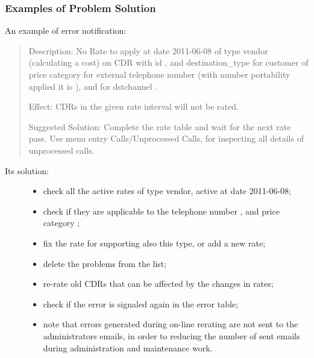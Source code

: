 \documentclass[letterpaper,10pt,english]{sphinxmanual}
\begin{document}
\subsubsection{Examples of Problem Solution}
\label{index:examples-of-problem-solution}
An example of error notification:
\begin{quote}

Description: No Rate to apply at date 2011-06-08 of type vendor (calculating a cost) on CDR with id , and destination\_type  for customer of price category  for external telephone number  (with number portability applied it is ), and for dstchannel .

Effect: CDRs in the given rate interval will not be rated.

Suggested Solution: Complete the rate table and wait for the next rate pass. Use menu entry Calls/Unprocessed Calls, for inspecting all details of unprocessed calls.
\end{quote}
\begin{description}
\item[{Its solution:}] \leavevmode\begin{itemize}
\item {} 
check all the active rates of type vendor, active at date 2011-06-08;

\item {} 
check if they are applicable to the telephone number , and price category ;

\item {} 
fix the rate for supporting also this type, or add a new rate;

\item {} 
delete the problems from the list;

\item {} 
re-rate old CDRs that can be affected by the changes in rates;

\item {} 
check if the error is signaled again in the error table;

\item {} 
note that errors generated during on-line rerating are not sent to the administrators emails, in order to reducing the number of sent emails during administration and maintenance work.

\end{itemize}

\end{description}
\end{document}
